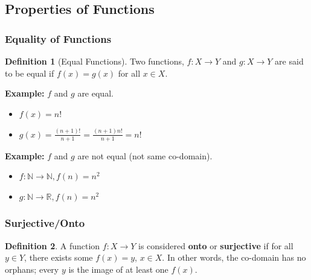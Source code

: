 \documentclass[12pt]{article}
\newcommand{\N}{\mathbb{N}}
\newcommand{\R}{\mathbb{R}}
\theoremstyle{definition}
\newtheorem{definition}{Definition}
\begin{document}
    \subsection{Properties of Functions}
    \subsubsection{Equality of Functions}
    \begin{definition}[Equal Functions]
        \label{def:equal-functions}
        Two functions, $f: X \to Y$ and $g: X \to Y$ are said to be equal if
        $f(x) = g(x)$ for all $x \in X$.
    \end{definition}

    \textbf{Example:} $f$ and $g$ are equal.
    \begin{itemize}
        \item $f(x) = n!$
        \item $g(x) = \frac{(n+1)!}{n+1} = \frac{(n+1)n!}{n+1}=n!$
    \end{itemize}

    \textbf{Example:} $f$ and $g$ are not equal (not same co-domain).
    \begin{itemize}
        \item $f:\N \to \N, f(n) = n^2$
        \item $g:\N \to \R, f(n) = n^2$
    \end{itemize}

    \subsubsection{Surjective/Onto}
    \begin{definition}
        \label{def:surjective}
        A function $f: X \to Y$ is considered \textbf{onto} or \textbf{surjective} if
        for all $y \in Y$, there exists some $f(x) = y$, $x \in X$. In other words,
        the co-domain has no orphans; every $y$ is the image of at least one $f(x)$.
    \end{definition}
\end{document}

